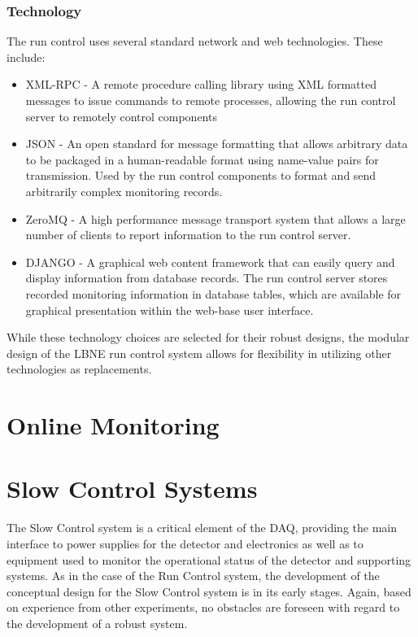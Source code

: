 \subsubsection{Technology}
The run control uses several standard network and
web technologies.  These include:
\begin{itemize}
\item{XML-RPC - A remote procedure calling library using XML
    formatted messages to issue commands to remote processes, allowing
    the run control server to remotely control components}
\item{JSON - An open standard for message formatting that allows
    arbitrary data to be packaged in a human-readable format using
    name-value pairs for transmission.  Used by the run control
    components to format and send arbitrarily complex monitoring
    records.}
\item{ZeroMQ - A high performance message transport system that allows
    a large number of clients to report information to the run control
    server.}
\item{DJANGO - A graphical web content framework that can easily query
    and display information from database records.  The run control server
    stores recorded monitoring information in database tables, which
    are available for graphical presentation within the web-base user
    interface.}
\end{itemize}
While these technology choices are selected for their robust designs,
the modular design of the LBNE run control system allows for
flexibility in utilizing other technologies as replacements.

\section{Online Monitoring}
\label{sec:daq_om}

\section{Slow Control Systems }
\label{sec:daq_slowcontrol}

  The
Slow Control system is a critical element of the DAQ, providing the
main interface to power supplies for the detector and electronics as
well as to equipment used to monitor the operational status of the
detector and supporting systems.  As in the case of the Run Control
system, the development of the conceptual design for the Slow Control
system is in its early stages.  Again, based on experience from other
experiments, no obstacles are foreseen with regard to the development
of a robust system.

